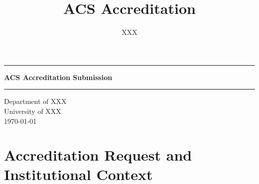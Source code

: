\documentclass[10pt,a4paper]{report}
\title{ACS Accreditation}
\author{XXX}
\begin{document}
%

\begin{titlepage}                                             %
\pagestyle{empty}                                             %
\centering                                                    %
\vspace{60mm}                                                 %
\hrule\vspace{5mm}                                            %
{\LARGE \textbf{{ACS Accreditation Submission}}} \\           %
\vspace{5mm}\hrule\vspace{20mm}                               %
{\large Department of XXX} \\ \vspace{2mm}                           %
\vfill                                                        %
{\small University of XXX\\ \today}
\cleardoublepage                                              %
\end{titlepage}



\setcounter{tocdepth}{3}
\tableofcontents



\part{Accreditation Request and Institutional Context}       




\end{document}
